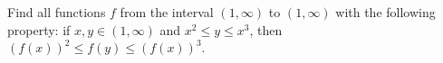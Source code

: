 Find all functions $f$ from the interval $(1, \infty)$ to $(1, \infty)$ with the following property:
if $x,y \in (1, \infty)$ and $x^2 \leq y \leq x^3$, then $(f(x))^2 \leq f(y) \leq (f(x))^3$.
